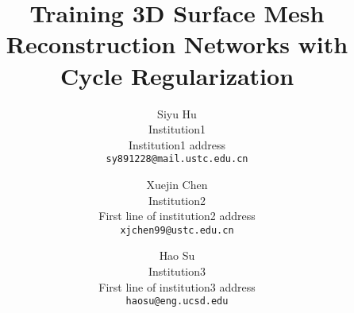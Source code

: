 \documentclass[10pt,twocolumn,letterpaper]{article}
\begin{document}
\title{Training 3D Surface Mesh Reconstruction Networks with Cycle Regularization}

\author{Siyu Hu\\
Institution1\\
Institution1 address\\
{\tt\small sy891228@mail.ustc.edu.cn}
\and
Xuejin Chen\\
Institution2\\
First line of institution2 address\\
{\tt\small xjchen99@ustc.edu.cn}
\and 
Hao Su\\
Institution3\\
First line of institution3 address\\
{\tt\small haosu@eng.ucsd.edu}
}

\maketitle
 





{\small


}

%
\end{document}
